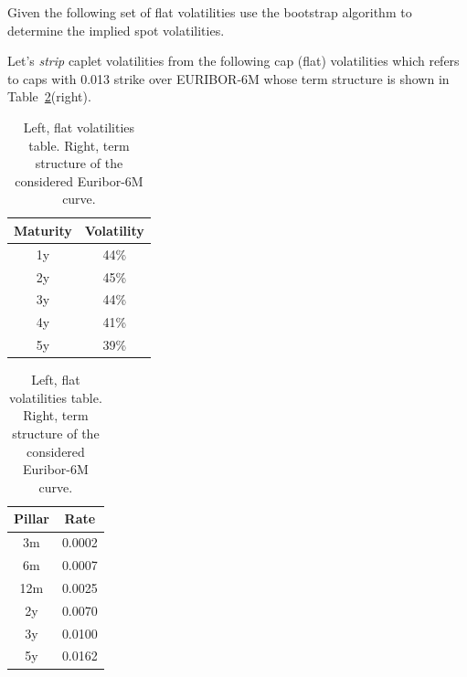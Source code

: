 \documentclass[12pt,a4paper]{book}
\begin{document}
\begin{question}[subtitle=Cap Volatilities (\texttt{python})]
Given the following set of flat volatilities use the bootstrap algorithm to determine the implied spot volatilities.

Let's \emph{strip} caplet volatilities from the following cap (flat) volatilities which refers to caps with 0.013 strike over EURIBOR-6M whose term structure is shown in Table~\ref{tab:flat_volatilities}(right).

\begin{table}[htpb]
\begin{center}
\renewcommand{\arraystretch}{2}
\begin{tabular}{|c|c|}
\hline
Maturity & Volatility \\ \hline
1y & 44\% \\ \hline
2y & 45\% \\ \hline
3y & 44\% \\ \hline
4y & 41\% \\ \hline
5y & 39\% \\ \hline
\end{tabular}
\quad
\begin{tabular}{|c|c|}
\hline
Pillar & Rate \\ \hline
3m & 0.0002 \\ \hline
6m & 0.0007 \\ \hline
12m & 0.0025 \\ \hline
2y  & 0.0070 \\ \hline
3y & 0.0100 \\ \hline
5y & 0.0162 \\ \hline
\end{tabular}
\end{center}
\label{tab:flat_volatilities}
\caption{Left, flat volatilities table. Right, term structure of the considered Euribor-6M curve.}
\end{table}
\end{question}
\end{document}
